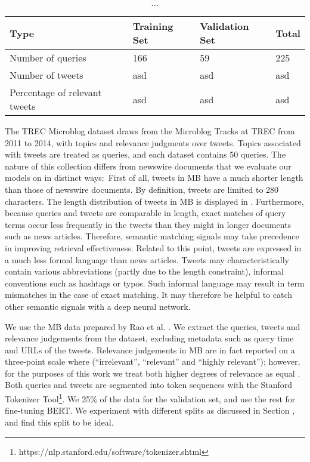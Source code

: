 \begin{table}[t]
\vspace{0.2cm}
\centering
\begin{tabular}{llll}
\toprule
\textbf{Type} \mbox{\hspace{0.5cm}} & \textbf{Training Set} \mbox{\hspace{1.0cm}} & \textbf{Validation Set} \mbox{\hspace{1.0cm}} & \textbf{Total} \mbox{\hspace{1.0cm}} \\
\toprule
Number of queries & 166 & 59 & 225 \\
Number  of tweets & asd & asd & asd \\
Percentage of relevant tweets  & asd      & asd & asd   \\
\bottomrule
\end{tabular}
\vspace{0.2cm}
\caption{...}%
\label{tab:mb-stats}
\vspace{-0.6cm}
\end{table}

The TREC Microblog dataset draws from the Microblog Tracks at TREC from 2011 to 2014, with topics and relevance judgments over tweets.
Topics associated with tweets are treated as queries, and each dataset contains 50 queries.
The nature of this collection differs from newswire documents that we evaluate our models on in distinct ways:\
First of all, tweets in MB have a much shorter length than those of newswire documents.
By definition, tweets are limited to 280 characters.
The length distribution of tweets in MB is displayed in .
Furthermore, because queries and tweets are comparable in length, exact matches of query terms occur less frequently in the tweets than they might in longer documents such as news articles.
Therefore, semantic matching signals may take precedence in improving retrieval effectiveness.
Related to this point, tweets are expressed in a much less formal language than news articles.
Tweets may characteristically contain various abbreviations (partly due to the length constraint), informal conventions such as hashtags or typos.
Such informal language may result in term mismatches in the case of exact matching.
It may therefore be helpful to catch other semantic signals with a deep neural network.

We use the MB data prepared by Rao et al. \cite{rao2019tweet}.
We extract the queries, tweets and relevance judgements from the dataset, excluding metadata such as query time and URLs of the tweets.
Relevance judgements in MB are in fact reported on a three-point scale where (``irrelevant'', ``relevant'' and ``highly relevant''); however, for the purposes of this work we treat both higher degrees of relevance as equal \cite{ounisoverview}.
Both queries and tweets are segmented into token sequences with the Stanford Tokenizer Tool\footnote{https://nlp.stanford.edu/software/tokenizer.shtml}.
We \myworries{sample} 25\% of the data for the validation set, and use the rest for fine-tuning BERT.
We experiment with different splits as discussed in Section \myworries{Exp-results}, and find this split to be ideal.

